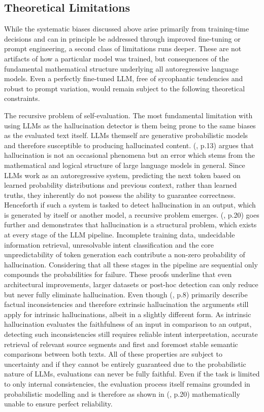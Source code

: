 \documentclass[
  seminar,   	 
  english,   	 
  titlepage=on,
  captions=tableheadings
]{ttlab-qualify}
\begin{document}
\subsection{Theoretical Limitations}
While the systematic biases discussed above arise primarily from training-time decisions and can in principle be addressed through improved fine-tuning or prompt engineering, a second class of limitations runs deeper. These are not artifacts of how a particular model was trained, but consequences of the fundamental mathematical structure underlying all autoregressive language models. Even a perfectly fine-tuned LLM, free of sycophantic tendencies and robust to prompt variation, would remain subject to the following theoretical constraints.

The recursive problem of self-evaluation. The most fundamental limitation with using LLMs as the hallucination detector is them being prone to the same biases as the evaluated text itself. LLMs themself are generative probabilistic models and therefore susceptible to producing hallucinated content. (\cite{Banerjee2024LLMsHallucinate}, p.13) argues that hallucination is not an occasional phenomena but an error which stems from the mathematical and logical structure of large language models in general. Since LLMs work as an autoregressive system, predicting the next token based on learned probability distributions and previous context, rather than learned truths, they inherently do not possess the ability to guarantee correctness. Henceforth if such a system is tasked to detect hallucination in an output, which is generated by itself or another model, a recursive problem emerges.
(\cite{Banerjee2024LLMsHallucinate}, p.20) goes further and demonstrates that hallucination is a structural problem, which exists at every stage of the LLM pipeline. Incomplete training data, undecidable information retrieval, unresolvable intent classification and the core unpredictability of token generation each contribute a non-zero probability of hallucination. Considering that all these stages in the pipeline are sequential only compounds the probabilities for failure.
These proofs underline that even architectural improvements, larger datasets or post-hoc detection can only reduce but never fully eliminate hallucination. Even though (\cite{Banerjee2024LLMsHallucinate}, p.8) primarily describe factual inconsistencies and therefore extrinsic hallucination the arguments still apply for intrinsic hallucinations, albeit in a slightly different form. As intrinsic hallucination evaluates the faithfulness of an input in comparison to an output, detecting such inconsistencies still requires reliable intent interpretation, accurate retrieval of relevant source segments and first and foremost stable semantic comparisons between both texts. All of these properties are subject to uncertainty and if they cannot be entirely guaranteed due to the probabilistic nature of LLMs, evaluations can never be fully faithful. Even if the task is limited to only internal consistencies, the evaluation process itself remains grounded in probabilistic modelling and is therefore as shown in (\cite{Banerjee2024LLMsHallucinate}, p.20) mathematically unable to ensure perfect reliability.
\end{document}
